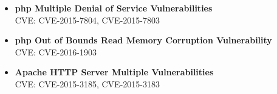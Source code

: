 \begin{itemize}
\item \textbf{php Multiple Denial of Service Vulnerabilities} \\
CVE: CVE-2015-7804, CVE-2015-7803\\


\item \textbf{php Out of Bounds Read Memory Corruption Vulnerability} \\
CVE: CVE-2016-1903\\

\item \textbf{Apache HTTP Server Multiple Vulnerabilities} \\
CVE: CVE-2015-3185, CVE-2015-3183\\


\end{itemize}
